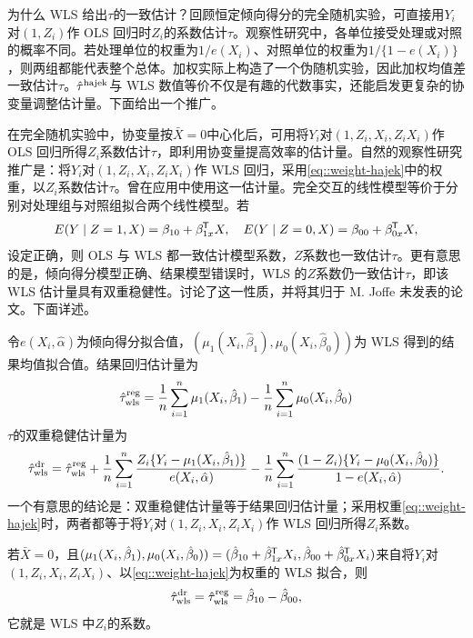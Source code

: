  



为什么 WLS 给出$\tau$的一致估计？回顾恒定倾向得分的完全随机实验，可直接用$Y_i$对$(1,Z_i)$作 OLS 回归时$Z_i$的系数估计$\tau$。观察性研究中，各单位接受处理或对照的概率不同。若处理单位的权重为$1/e(X_i)$、对照单位的权重为$1/\{ 1-e(X_i)\}$，则两组都能代表整个总体。加权实际上构造了一个伪随机实验，因此加权均值差一致估计$\tau$。$\hat{\tau}^\textup{hajek}$与 WLS 数值等价不仅是有趣的代数事实，还能启发更复杂的协变量调整估计量。下面给出一个推广。


在完全随机实验中，协变量按$\bar{X} = 0$中心化后，可用将$Y_i$对$(1,Z_i, X_i, Z_iX_i)$作 OLS 回归所得$Z_i$系数估计$\tau$，即利用协变量提高效率的\citet{lin2013}估计量。自然的观察性研究推广是：将$Y_i$对$(1,Z_i, X_i, Z_iX_i)$作 WLS 回归，采用\eqref{eq::weight-hajek}中的权重，以$Z_i$系数估计$\tau$。\citet{hirano2001estimation}曾在应用中使用这一估计量。完全交互的线性模型等价于分别对处理组与对照组拟合两个线性模型。若
$$
E(Y\mid Z=1, X) = \beta_{10} +  \beta_{1x}^{\mkern-1.5mu\mathsf{T}} X,\quad
E(Y\mid Z=0, X) = \beta_{00} +  \beta_{0x}^{\mkern-1.5mu\mathsf{T}} X,
$$
设定正确，则 OLS 与 WLS 都一致估计模型系数，$Z$系数也一致估计$\tau$。更有意思的是，倾向得分模型正确、结果模型错误时，WLS 的$Z$系数仍一致估计$\tau$，即该 WLS 估计量具有双重稳健性。\citet{robins2007comment}讨论了这一性质，并将其归于 M. Joffe 未发表的论文。下面详述。 



令$e(X_i, \hat{\alpha})$为倾向得分拟合值，$( \mu_1(X_i, \hat{\beta}_1),  \mu_0(X_i, \hat{\beta}_0)) $为 WLS 得到的结果均值拟合值。结果回归估计量为
$$
\hat{\tau}^\text{reg}_\text{wls} = \frac{1}{n} \sum_{i=1}^n \mu_1(X_i, \hat{\beta}_1) - \frac{1}{n} \sum_{i=1}^n \mu_0(X_i, \hat{\beta}_0)
$$
$\tau$的双重稳健估计量为
$$
\hat{\tau}^\text{dr}_\text{wls}  = 
\hat{\tau}^\text{reg}_\text{wls}  + \frac{1}{n} \sum_{i=1}^n  \frac{Z_i \{ Y_i- \mu_1(X_i, \hat{\beta}_1)\}  }{  e(X_i, \hat{\alpha}) } 
- \frac{1}{n} \sum_{i=1}^n  \frac{(1-Z_i) \{ Y_i- \mu_0(X_i, \hat{\beta}_0)\}  }{  1- e(X_i, \hat{\alpha}) }   .
$$
一个有意思的结论是：双重稳健估计量等于结果回归估计量；采用权重\eqref{eq::weight-hajek}时，两者都等于将$Y_i$对$(1,Z_i, X_i, Z_iX_i)$作 WLS 回归所得$Z_i$系数。 




 

\begin{theorem}
\label{thm::numerical-equivalence-wls-dr}
若$\bar{X}=0$，且$( \mu_1(X_i, \hat{\beta}_1),  \mu_0(X_i, \hat{\beta}_0)) = (  \hat \beta_{10} +   \hat \beta_{1x}^{\mkern-1.5mu\mathsf{T}} X_i ,   \hat \beta_{00} +   \hat\beta_{0x}^{\mkern-1.5mu\mathsf{T}} X_i )$来自将$Y_i$对$(1,Z_i, X_i, Z_iX_i)$、以\eqref{eq::weight-hajek}为权重的 WLS 拟合，则
$$
\hat{\tau}^\textup{dr}_\textup{wls}  = \hat{\tau}^\textup{reg}_\textup{wls} 
= \hat \beta_{10} - \hat \beta_{00} ,
$$
它就是 WLS 中$Z_i$的系数。 
\end{theorem}

